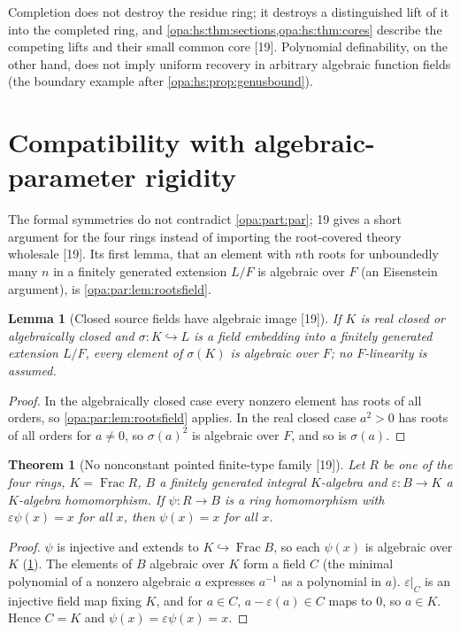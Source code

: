 \documentclass[11pt,oneside]{article}
\numberwithin{equation}{section}
\newtheorem{theorem}{Theorem}[section]
\newtheorem{lemma}[lemma]{Lemma}
\theoremstyle{definition}
\theoremstyle{remark}
\newcommand{\Frac}{\operatorname{Frac}}
\newcommand{\src}[1]{\textup{\textsf{\small[#1]}}}
\begin{document}
Completion does not destroy the residue ring; it destroys a distinguished lift of it into the completed ring, and \cref{opa:hs:thm:sections,opa:hs:thm:cores}
describe the competing lifts and their small common core \src{19}. Polynomial definability, on the other hand, does not imply uniform recovery in
arbitrary algebraic function fields (the boundary example after \cref{opa:hs:prop:genusbound}).

\section{Compatibility with algebraic-parameter rigidity}\label{opa:hs:sec:nonalg}

The formal symmetries do not contradict \cref{opa:part:par}; 19 gives a short argument for the four rings instead of importing the root-covered theory
wholesale \src{19}. Its first lemma, that an element with $n$th roots for unboundedly many $n$ in a finitely generated extension $L/F$ is algebraic over $F$
(an Eisenstein argument), is \cref{opa:par:lem:rootsfield}.

\begin{lemma}[Closed source fields have algebraic image \src{19}]\label{opa:hs:lem:closedfield}
If $K$ is real closed or algebraically closed and $\sigma:K\hookrightarrow L$ is a field embedding into a finitely generated extension $L/F$, every element of
$\sigma(K)$ is algebraic over $F$; no $F$-linearity is assumed.
\end{lemma}
\begin{proof}
In the algebraically closed case every nonzero element has roots of all orders, so \cref{opa:par:lem:rootsfield} applies. In the real closed case $a^2>0$ has
roots of all orders for $a\ne0$, so $\sigma(a)^2$ is algebraic over $F$, and so is $\sigma(a)$.
\end{proof}

\begin{theorem}[No nonconstant pointed finite-type family \src{19}]\label{opa:hs:thm:pointed}
Let $R$ be one of the four rings, $K=\Frac R$, $B$ a finitely generated integral $K$-algebra and $\varepsilon:B\to K$ a $K$-algebra homomorphism. If
$\psi:R\to B$ is a ring homomorphism with $\varepsilon\psi(x)=x$ for all $x$, then $\psi(x)=x$ for all $x$.
\end{theorem}
\begin{proof}
$\psi$ is injective and extends to $K\hookrightarrow\Frac B$, so each $\psi(x)$ is algebraic over $K$ (\cref{opa:hs:lem:closedfield}). The elements of $B$ algebraic
over $K$ form a field $C$ (the minimal polynomial of a nonzero algebraic $a$ expresses $a^{-1}$ as a polynomial in $a$). $\varepsilon|_C$ is an injective field map
fixing $K$, and for $a\in C$, $a-\varepsilon(a)\in C$ maps to $0$, so $a\in K$. Hence $C=K$ and $\psi(x)=\varepsilon\psi(x)=x$.
\end{proof}
\end{document}
